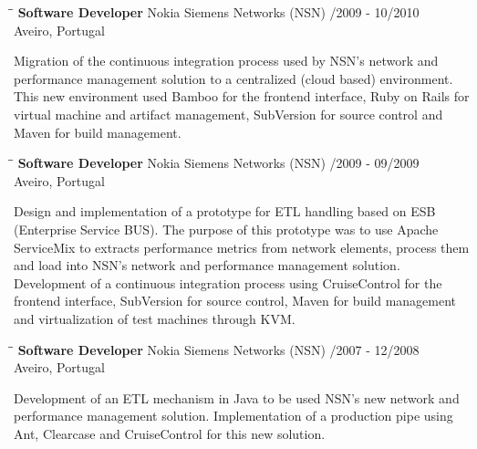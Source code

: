 \documentclass{res}
\begin{document}
\begin{resume}
\begin{tabbing}
\hspace{2.3in}\= \hspace{2.6in}\= \kill %
{\bf Software Developer} \>Nokia Siemens Networks (NSN)    
/2009 - 10/2010\\ \>Aveiro, Portugal
\end{tabbing}\vspace{-20pt}      %
Migration of the continuous integration process used by NSN's network and
performance management solution to a centralized (cloud based) environment. This new environment used Bamboo for the frontend interface, Ruby on Rails for
virtual machine and artifact management, SubVersion for source control and Maven for build management.

\begin{tabbing}
\hspace{2.3in}\= \hspace{2.6in}\= \kill %
{\bf Software Developer} \>Nokia Siemens Networks (NSN)    
/2009 - 09/2009\\ \>Aveiro, Portugal
\end{tabbing}\vspace{-20pt}      %
Design and implementation of a prototype for ETL handling based on ESB
(Enterprise Service BUS). The purpose of this prototype was to use Apache
ServiceMix to extracts performance metrics from network elements, process them
and load into NSN's network and performance management solution. Development of
a continuous integration process using CruiseControl for the frontend
interface, SubVersion for source control, Maven for build management and
virtualization of test machines through KVM.

\begin{tabbing}
\hspace{2.3in}\= \hspace{2.6in}\= \kill %
{\bf Software Developer} \>Nokia Siemens Networks (NSN)    
/2007 - 12/2008\\ \>Aveiro, Portugal
\end{tabbing}\vspace{-20pt}      %
Development of an ETL mechanism in Java to be used NSN's new network and
performance management solution. Implementation of a production pipe using Ant,
Clearcase and CruiseControl for this new solution.


\end{resume}
\end{document}
